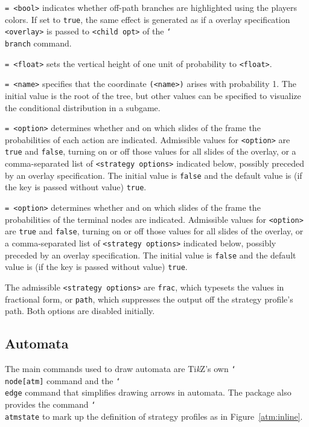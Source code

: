 \documentclass{article}
\newenvironment{desc}{\itemize[leftmargin=50pt]}{\enditemize}
\def\option#1#2{\item[\texttt{#1}] \hskip-1.5pt\texttt{#2}}
\renewcommand{\textbackslash}{\char`\\}
\def\cmd#1{\texttt{\color{cmd}\textbackslash#1}}
\def\optarg[#1]{{\color{player1}[#1]}}
\def\TikZ{Ti\emph{k}Z\xspace}
\begin{document}
\begin{desc}
\option{positive only}{= <bool>} indicates whether off-path branches are highlighted using the players colors. If set to \texttt{true}, the same effect is generated as if a overlay specification \texttt{<overlay>} is passed to \texttt{<child opt>} of the \cmd{branch} command.

\option{prob}{= <float>} sets the vertical height of one unit of probability to \texttt{<float>}.

\option{root}{= <name>} specifies that the coordinate \texttt{(<name>)} arises with probability 1. The initial value is the root of the tree, but other values can be specified to visualize the conditional distribution in a subgame.

\option{show prob}{= <option>} determines whether and on which slides of the frame the probabilities of each action are indicated. Admissible values for \texttt{<option>} are \texttt{true} and \texttt{false}, turning on or off those values for all slides of the overlay, or a comma-separated list of \texttt{<strategy options>} indicated below, possibly preceded by an overlay specification. The initial value is \texttt{false} and the default value is (if the key is passed without value) \texttt{true}.

\option{show terminal}{= <option>} determines whether and on which slides of the frame the probabilities of the terminal nodes are indicated. Admissible values for \texttt{<option>} are \texttt{true} and \texttt{false}, turning on or off those values for all slides of the overlay, or a comma-separated list of \texttt{<strategy options>} indicated below, possibly preceded by an overlay specification. The initial value is \texttt{false} and the default value is (if the key is passed without value) \texttt{true}.
\end{desc}

\noindent The admissible \texttt{<strategy options>} are \texttt{frac}, which typesets the values in fractional form, or \texttt{path}, which suppresses the output off the strategy profile's path. Both options are disabled initially.

\subsection{Automata}\label{sec:Automata}

The main commands used to draw automata are \TikZ's own \cmd{node\optarg[atm]} command and the \cmd{edge} command that simplifies drawing arrows in automata. The package also provides the command \cmd{atmstate} to mark up the definition of strategy profiles as in Figure~\ref{atm:inline}. 
\end{document}

